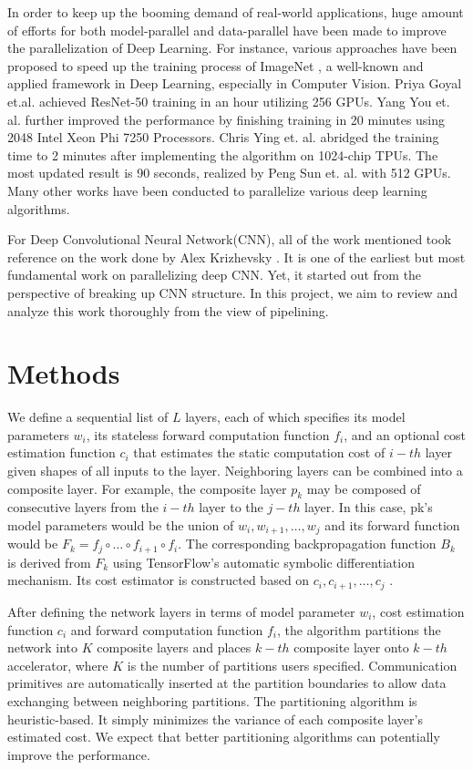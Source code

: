 \documentclass[conference]{IEEEtran}
\begin{document}
In order to keep up the booming demand of real-world applications, huge amount of efforts for both model-parallel and data-parallel have been made to improve the parallelization of Deep Learning. For instance, various approaches have been proposed to speed up the training process of ImageNet \cite{r1}, a well-known and applied framework in Deep Learning, especially in Computer Vision. Priya Goyal et.al. \cite{r2} achieved ResNet-50 training in an hour utilizing 256 GPUs. Yang You et. al. \cite{r3} further improved the performance by finishing training in 20 minutes using 2048 Intel Xeon Phi 7250 Processors. Chris Ying et. al. \cite{r4} abridged the training time to 2 minutes after implementing the algorithm on 1024-chip TPUs. The most updated result is 90 seconds, realized by Peng Sun et. al. \cite{r5} with 512 GPUs. Many other works have been conducted to parallelize various deep learning algorithms. 

For Deep Convolutional Neural Network(CNN), all of the work mentioned took reference on the work done by Alex Krizhevsky \cite{r6}. It is one of the earliest but most fundamental work on parallelizing deep CNN. Yet, it started out from the perspective of breaking up CNN structure. In this project, we aim to review and analyze this work thoroughly from the view of pipelining. 

\section{Methods}

We define a sequential list of $L$ layers, each of which specifies its model parameters $w_i$, its stateless forward computation function $f_i$, and an optional cost estimation function $c_i$ that estimates the static computation cost of $i-th$ layer given shapes of all inputs to the layer. Neighboring layers can be combined into a composite layer. For example, the composite layer $p_k$ may be composed of consecutive layers from the $i-th$ layer to the $j-th$ layer. In this case, pk’s model parameters would be the union of $w_i, w_{i+1}, \dots, w_j$ and its forward function would be $F_k = f_j \circ \dots \circ f_{i+1} \circ f_i$. The corresponding backpropagation function $B_k$ is derived from $F_k$ using TensorFlow’s automatic symbolic differentiation mechanism. Its cost estimator is constructed based on $c_i, c_{i+1}, \dots, c_j$ .

After defining the network layers in terms of model parameter $w_i$, cost estimation function $c_i$ and forward computation function $f_i$, the algorithm partitions the network into $K$ composite layers and places $k-th$ composite layer onto $k-th$ accelerator, where $K$ is the number of partitions users specified. Communication primitives are automatically inserted at the partition boundaries to allow data exchanging between neighboring partitions. The partitioning algorithm is heuristic-based. It simply minimizes the variance of each composite layer’s estimated cost. We expect that better partitioning algorithms can potentially improve the performance.
\end{document}
